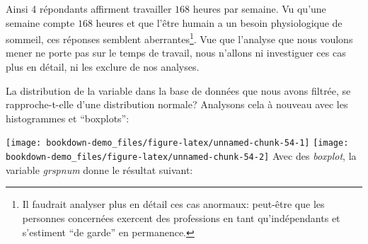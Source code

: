 \documentclass[
]{book}
\newenvironment{Shaded}{\begin{snugshade}}{\end{snugshade}}
\newcommand{\AttributeTok}[1]{\textcolor[rgb]{0.77,0.63,0.00}{#1}}
\newcommand{\CommentTok}[1]{\textcolor[rgb]{0.56,0.35,0.01}{\textit{#1}}}
\newcommand{\DecValTok}[1]{\textcolor[rgb]{0.00,0.00,0.81}{#1}}
\newcommand{\FunctionTok}[1]{\textcolor[rgb]{0.00,0.00,0.00}{#1}}
\newcommand{\NormalTok}[1]{#1}
\newcommand{\SpecialCharTok}[1]{\textcolor[rgb]{0.00,0.00,0.00}{#1}}
\newcommand{\StringTok}[1]{\textcolor[rgb]{0.31,0.60,0.02}{#1}}
\begin{document}
Ainsi 4 répondants affirment travailler \(168\) heures par semaine. Vu qu'une semaine compte \(168\) heures et que l'être humain a un besoin physiologique de sommeil, ces réponses semblent aberrantes\footnote{Il faudrait analyser plus en détail ces cas anormaux: peut-être que les personnes concernées exercent des professions en tant qu'indépendants et s'estiment ``de garde'' en permanence.}. Vue que l'analyse que nous voulons mener ne porte pas sur le temps de travail, nous n'allons ni investiguer ces cas plus en détail, ni les exclure de nos analyses.

La distribution de la variable dans la base de données que nous avons filtrée, se rapproche-t-elle d'une distribution normale? Analysons cela à nouveau avec les histogrammes et ``boxplots'':

\begin{Shaded}
\end{Shaded}

\texttt{[image: bookdown-demo\_files/figure-latex/unnamed-chunk-54-1]} \texttt{[image: bookdown-demo\_files/figure-latex/unnamed-chunk-54-2]}
Avec des \emph{boxplot}, la variable \emph{grspnum} donne le résultat suivant:
\end{document}
